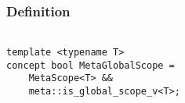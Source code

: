 
\subsubsection{Definition}

\begin{verbatim}

template <typename T>
concept bool MetaGlobalScope =
	MetaScope<T> &&
	meta::is_global_scope_v<T>;

\end{verbatim}
